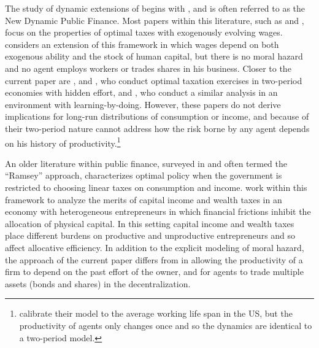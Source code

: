 \documentclass[11pt]{article}
\theoremstyle{plain}
\begin{document}
The study of dynamic extensions of \cite{mirrlees_exploration_1971} begins with \cite{golosov_optimal_2003}, and is often referred to as the New Dynamic Public Finance. Most papers within this literature, such as \cite{golosov_redistribution_2016} and \cite{farhi_insurance_2013}, focus on the properties of optimal taxes with exogenously evolving wages. \cite{stantcheva_optimal_2017} considers an extension of this framework in which wages depend on both exogenous ability and the stock of human capital, but there is no moral hazard and no agent employs workers or trades shares in his business. Closer to the current paper are \cite{albanesi_optimal_2006}, \cite{kapicka_optimal_2019} and \cite{best_optimal_2012}, who conduct optimal taxation exercises in two-period economies with hidden effort, and \cite{makris_taxation_2021}, who conduct a similar analysis in an environment with learning-by-doing. However, these papers do not derive implications for long-run distributions of consumption or income, and because of their two-period nature cannot address how the risk borne by any agent depends on his history of productivity.\footnote{\cite{makris_taxation_2021} calibrate their model to the average working life span in the US, but the productivity of agents only changes once and so the dynamics are identical to a two-period model.} 


An older literature within public finance, surveyed in \cite{chari_optimal_1999} and often termed the ``Ramsey'' approach, characterizes optimal policy when the government is restricted to choosing linear taxes on consumption and income. \cite{guvenen_use_2019} work within this framework to analyze the merits of capital income and wealth taxes in an economy with heterogeneous entrepreneurs in which financial frictions inhibit the allocation of physical capital. In this setting capital income and wealth taxes place different burdens on productive and unproductive entrepreneurs and so affect allocative efficiency. In addition to the explicit modeling of moral hazard, the approach of the current paper differs from \cite{guvenen_use_2019} in allowing the productivity of a firm to depend on the past effort of the owner, and for agents to trade multiple assets (bonds and shares) in the decentralization.
\end{document}
